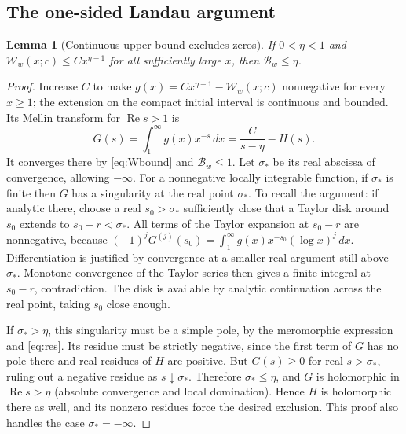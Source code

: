 \documentclass[11pt]{article}
\newtheorem{lemma}[theorem]{Lemma}
\theoremstyle{remark}\newtheorem{remark}[theorem]{Remark}
\newcommand{\Rea}{\operatorname{Re}}\newcommand{\Ima}{\operatorname{Im}}
\newcommand{\B}{\mathcal B}\newcommand{\W}{\mathcal W}
\begin{document}
\subsection{The one-sided Landau argument}
\begin{lemma}[Continuous upper bound excludes zeros]\label{lem:landau}
If $0<\eta<1$ and $\W_w(x;c)\le C x^{\eta-1}$ for all sufficiently large $x$, then $\B_w\le\eta$.
\end{lemma}
\begin{proof}
Increase $C$ to make $g(x)=Cx^{\eta-1}-\W_w(x;c)$ nonnegative for every $x\ge1$; the extension on the compact initial interval is continuous and bounded. Its Mellin transform for $\Rea s>1$ is
\[
 G(s)=\int_1^\infty g(x)x^{-s}\,dx=\frac C{s-\eta}-H(s).
\]
It converges there by \eqref{eq:Wbound} and $\B_w\le1$. Let $\sigma_*$ be its real abscissa of convergence, allowing $-\infty$. For a nonnegative locally integrable function, if $\sigma_*$ is finite then $G$ has a singularity at the real point $\sigma_*$. To recall the argument: if analytic there, choose a real $s_0>\sigma_*$ sufficiently close that a Taylor disk around $s_0$ extends to $s_0-r<\sigma_*$. All terms of the Taylor expansion at $s_0-r$ are nonnegative, because $(-1)^jG^{(j)}(s_0)=\int_1^\infty g(x)x^{-s_0}(\log x)^j\,dx$. Differentiation is justified by convergence at a smaller real argument still above $\sigma_*$. Monotone convergence of the Taylor series then gives a finite integral at $s_0-r$, contradiction. The disk is available by analytic continuation across the real point, taking $s_0$ close enough.

If $\sigma_*>\eta$, this singularity must be a simple pole, by the meromorphic expression and \eqref{eq:res}. Its residue must be strictly negative, since the first term of $G$ has no pole there and real residues of $H$ are positive. But $G(s)\ge0$ for real $s>\sigma_*$, ruling out a negative residue as $s\downarrow\sigma_*$. Therefore $\sigma_*\le\eta$, and $G$ is holomorphic in $\Rea s>\eta$ (absolute convergence and local domination). Hence $H$ is holomorphic there as well, and its nonzero residues force the desired exclusion. This proof also handles the case $\sigma_*=-\infty$.
\end{proof}
\end{document}
